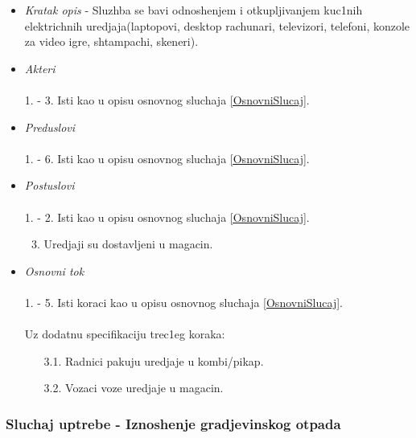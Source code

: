 \documentclass[10 pt]{article}
\begin{document}
		\begin{itemize}
			\item\textit{Kratak opis} - Sluzhba se bavi odnoshenjem i otkupljivanjem kuc1nih elektrichnih uredjaja(laptopovi, desktop rachunari, televizori, telefoni, konzole za video igre, shtampachi, skeneri).
			
			\item\textit{Akteri}\\\\ 
			1. - 3. Isti kao u opisu osnovnog sluchaja \ref{OsnovniSlucaj}. 
			
			\item\textit{Preduslovi}\\\\ 
			1. - 6. Isti kao u opisu osnovnog sluchaja \ref{OsnovniSlucaj}.
			
			\item\textit{Postuslovi}\\\\
			1. - 2. Isti kao u opisu osnovnog sluchaja \ref{OsnovniSlucaj}.
				\begin{enumerate}
					\setcounter{enumi}{2}
					\item Uredjaji su dostavljeni u magacin.
				\end{enumerate}
		
			\item\textit{Osnovni tok}\\\\
			1. - 5. Isti koraci kao u opisu osnovnog sluchaja \ref{OsnovniSlucaj}.\\\\
			Uz dodatnu specifikaciju trec1eg koraka:
			\begin{enumerate}
				\item [3.1.] Radnici pakuju uredjaje u kombi/pikap.
				\item [3.2.] Vozaci voze uredjaje u magacin.
			\end{enumerate}
			
		\end{itemize}
	
	\subsubsection{Sluchaj uptrebe - Iznoshenje gradjevinskog otpada}
		
\end{document}
